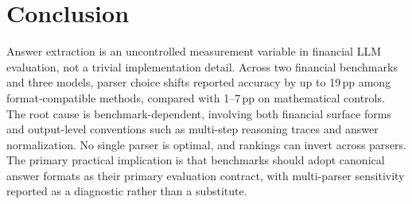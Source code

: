 \section{Conclusion}
\label{sec:conclusion}

Answer extraction is an uncontrolled measurement variable in financial LLM evaluation, not a trivial implementation detail. Across two financial benchmarks and three models, parser choice shifts reported accuracy by up to 19\,pp among format-compatible methods, compared with 1--7\,pp on mathematical controls. The root cause is benchmark-dependent, involving both financial surface forms and output-level conventions such as multi-step reasoning traces and answer normalization. No single parser is optimal, and rankings can invert across parsers. The primary practical implication is that benchmarks should adopt canonical answer formats as their primary evaluation contract, with multi-parser sensitivity reported as a diagnostic rather than a substitute.
